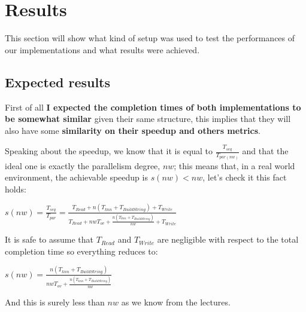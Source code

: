 \section{Results}
This section will show what kind of setup was used to test the performances of our implementations and what results were achieved.

\subsection{Expected results}
First of all\textbf{ I expected the completion times of both implementations to be somewhat similar} given their same structure, this implies that they will also have some \textbf{similarity on their speedup and others metrics}.
\vspace{3mm}

Speaking about the speedup, we know that it is equal to $\frac{T_{seq}}{T_{par(nw)}}$ and that the ideal one is exactly the parallelism degree, $nw$; this means that, in a real world environment, the achievable speedup is $s(nw)<nw$, let's check it this fact holds:
\begin{center}
\begin{Large}
$s(nw)=\frac{T_{seq}}{T_{par}}=\frac{T_{Read}+n(T_{knn}+T_{BuildString})+T_{Write}}{T_{Read}+nwT_{ov}+\frac{n(T_{knn}+T_{BuildString})}{nw}+T_{Write}}$
\end{Large}
\end{center}
It is safe to assume that $T_{Read}$ and $T_{Write}$ are negligible with respect to the total completion time so everything reduces to:
\begin{center}
\begin{Large}
$s(nw)=\frac{n(T_{knn}+T_{BuildString})}{nwT_{ov}+\frac{n(T_{knn}+T_{BuildString})}{nw}}$
\end{Large}
\end{center}
And this is surely less than $nw$ as we know from the lectures.

